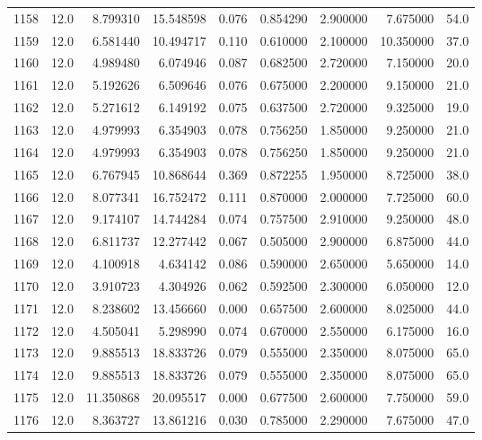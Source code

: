 \begin{tabular}{lrrrrrrrr}
1158 &   12.0 &   8.799310 &  15.548598 &  0.076 &  0.854290 &  2.900000 &   7.675000 &   54.0 \\
1159 &   12.0 &   6.581440 &  10.494717 &  0.110 &  0.610000 &  2.100000 &  10.350000 &   37.0 \\
1160 &   12.0 &   4.989480 &   6.074946 &  0.087 &  0.682500 &  2.720000 &   7.150000 &   20.0 \\
1161 &   12.0 &   5.192626 &   6.509646 &  0.076 &  0.675000 &  2.200000 &   9.150000 &   21.0 \\
1162 &   12.0 &   5.271612 &   6.149192 &  0.075 &  0.637500 &  2.720000 &   9.325000 &   19.0 \\
1163 &   12.0 &   4.979993 &   6.354903 &  0.078 &  0.756250 &  1.850000 &   9.250000 &   21.0 \\
1164 &   12.0 &   4.979993 &   6.354903 &  0.078 &  0.756250 &  1.850000 &   9.250000 &   21.0 \\
1165 &   12.0 &   6.767945 &  10.868644 &  0.369 &  0.872255 &  1.950000 &   8.725000 &   38.0 \\
1166 &   12.0 &   8.077341 &  16.752472 &  0.111 &  0.870000 &  2.000000 &   7.725000 &   60.0 \\
1167 &   12.0 &   9.174107 &  14.744284 &  0.074 &  0.757500 &  2.910000 &   9.250000 &   48.0 \\
1168 &   12.0 &   6.811737 &  12.277442 &  0.067 &  0.505000 &  2.900000 &   6.875000 &   44.0 \\
1169 &   12.0 &   4.100918 &   4.634142 &  0.086 &  0.590000 &  2.650000 &   5.650000 &   14.0 \\
1170 &   12.0 &   3.910723 &   4.304926 &  0.062 &  0.592500 &  2.300000 &   6.050000 &   12.0 \\
1171 &   12.0 &   8.238602 &  13.456660 &  0.000 &  0.657500 &  2.600000 &   8.025000 &   44.0 \\
1172 &   12.0 &   4.505041 &   5.298990 &  0.074 &  0.670000 &  2.550000 &   6.175000 &   16.0 \\
1173 &   12.0 &   9.885513 &  18.833726 &  0.079 &  0.555000 &  2.350000 &   8.075000 &   65.0 \\
1174 &   12.0 &   9.885513 &  18.833726 &  0.079 &  0.555000 &  2.350000 &   8.075000 &   65.0 \\
1175 &   12.0 &  11.350868 &  20.095517 &  0.000 &  0.677500 &  2.600000 &   7.750000 &   59.0 \\
1176 &   12.0 &   8.363727 &  13.861216 &  0.030 &  0.785000 &  2.290000 &   7.675000 &   47.0 \\

\end{tabular}
